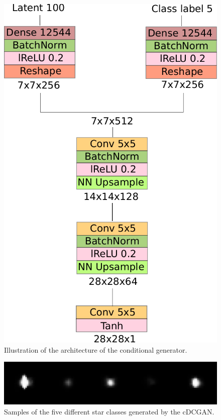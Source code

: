 \documentclass[10pt,conference,compsocconf]{IEEEtran}
\begin{document}
\begin{figure}
    \centering
    \includegraphics[width=0.6\columnwidth]{assets/cgen_arch.pdf}
    \caption{Illustration of the architecture of the conditional generator.}
    \label{fig:cgen_arch}
\end{figure}

\begin{figure}
    \centering
    \includegraphics[width=\columnwidth]{assets/clustered_generated_stars_resized.png}
    \caption{Samples of the five different star classes generated by the cDCGAN.}
    \label{fig:clustered_generated_stars}
\end{figure}

\end{document}
